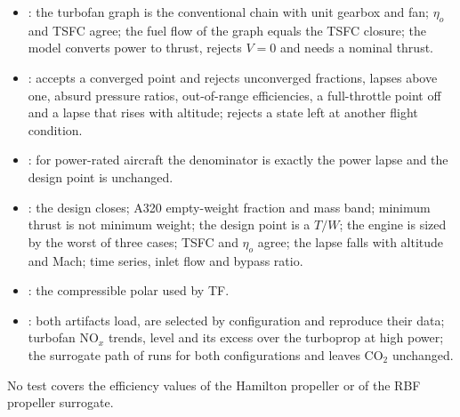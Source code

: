 \documentclass[a4paper,11pt]{article}
\newcommand{\etao}{\eta_{o}}
\begin{document}
\begin{itemize}
\item {}: the turbofan graph is the conventional
  chain with unit gearbox and fan; $\etao$ and TSFC agree; the fuel flow of the graph equals the
  TSFC closure; the model converts power to thrust, rejects $V = 0$ and needs a nominal thrust.
\item {}:  accepts a
  converged point and rejects unconverged fractions, lapses above one, absurd pressure ratios,
  out-of-range efficiencies, a full-throttle point off  and a lapse that rises with
  altitude;  rejects a state left at another flight condition.
\item {}: for power-rated aircraft the
  denominator is exactly the power lapse and the design point is unchanged.
\item {}: the design
  closes; A320 empty-weight fraction and mass band; minimum thrust is not minimum weight; the
  design point is a $T/W$; the engine is sized by the worst of three cases; TSFC and $\etao$
  agree; the lapse falls with altitude and Mach; time series, inlet flow and bypass ratio.
\item {}: the compressible polar used by TF.
\item {}: both artifacts load, are selected by
  configuration and reproduce their data; turbofan NO$_x$ trends, level and its excess over the
  turboprop at high power; the surrogate path of  runs for both
  configurations and leaves CO$_2$ unchanged.
\end{itemize}
No test covers the efficiency values of the Hamilton propeller or of the RBF propeller
surrogate.
\end{document}
